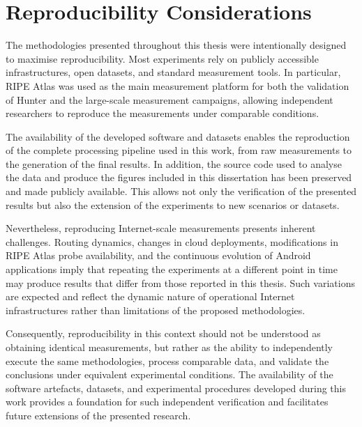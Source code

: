 \section{Reproducibility Considerations}
\label{sc:reproducibility_considerations}

The methodologies presented throughout this thesis were intentionally designed to maximise reproducibility. Most experiments rely on publicly accessible infrastructures, open datasets, and standard measurement tools. In particular, RIPE Atlas was used as the main measurement platform for both the validation of Hunter and the large-scale measurement campaigns, allowing independent researchers to reproduce the measurements under comparable conditions.

The availability of the developed software and datasets enables the reproduction of the complete processing pipeline used in this work, from raw measurements to the generation of the final results. In addition, the source code used to analyse the data and produce the figures included in this dissertation has been preserved and made publicly available. This allows not only the verification of the presented results but also the extension of the experiments to new scenarios or datasets.

Nevertheless, reproducing Internet-scale measurements presents inherent challenges. Routing dynamics, changes in cloud deployments, modifications in RIPE Atlas probe availability, and the continuous evolution of Android applications imply that repeating the experiments at a different point in time may produce results that differ from those reported in this thesis. Such variations are expected and reflect the dynamic nature of operational Internet infrastructures rather than limitations of the proposed methodologies.

Consequently, reproducibility in this context should not be understood as obtaining identical measurements, but rather as the ability to independently execute the same methodologies, process comparable data, and validate the conclusions under equivalent experimental conditions. The availability of the software artefacts, datasets, and experimental procedures developed during this work provides a foundation for such independent verification and facilitates future extensions of the presented research.
